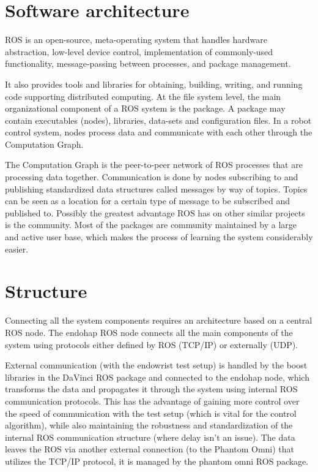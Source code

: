 \section{Software architecture}
ROS is an open-source, meta-operating system that handles
hardware abstraction, low-level device control, implementation
of commonly-used functionality, message-passing between
processes, and package management.

 It also provides tools and libraries for obtaining, building, writing, and running code supporting distributed computing. At the file system level, the main organizational component of a ROS system
is the package. A package may contain executables (nodes),
libraries, data-sets and configuration files. In a robot control
system, nodes process data and communicate with each other
through the Computation Graph.

The Computation Graph is the peer-to-peer network of ROS
processes that are processing data together. Communication
is done by nodes subscribing to and publishing standardized
data structures called messages by way of topics. Topics can
be seen as a location for a certain type of message to be
subscribed and published to. Possibly the greatest advantage
ROS has on other similar projects is the community. Most of
the packages are community maintained by a large and active
user base, which makes the process of learning the system
considerably easier.

\section*{Structure}
Connecting all the system components requires an architecture based on a central ROS node.
The endohap ROS node connects all the main components of the system using protocols either defined by ROS (TCP/IP) or externally (UDP).

External communication (with the endowrist test setup) is handled by the boost libraries in the DaVinci ROS package and connected to the endohap node, which transforms the data and propagates it through the system using internal ROS communication protocols. 
This has the advantage of gaining more control over the speed of communication with the test setup (which is vital for the control algorithm), while also maintaining the robustness and standardization of the internal ROS communication structure (where delay isn't an issue). The data leaves the ROS via another external connection (to the Phantom Omni) that utilizes the TCP/IP protocol, it is managed by the phantom omni ROS package.

